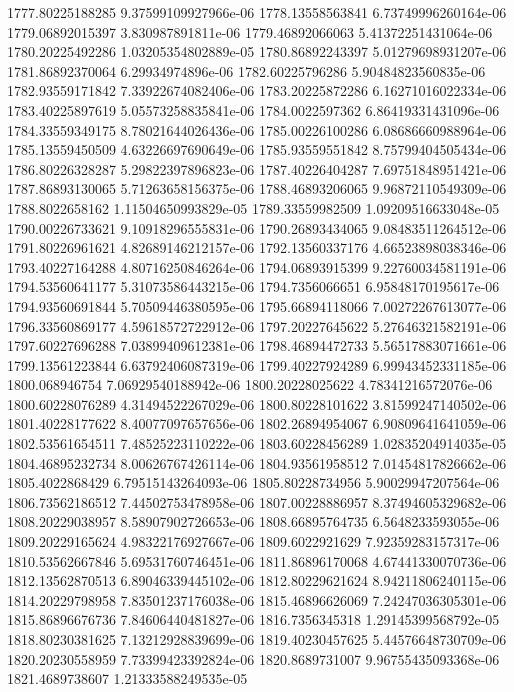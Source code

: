 {1777.80225188285 9.37599109927966e-06
1778.13558563841 6.73749996260164e-06
1779.06892015397 3.830987891811e-06
1779.46892066063 5.41372251431064e-06
1780.20225492286 1.03205354802889e-05
1780.86892243397 5.01279698931207e-06
1781.86892370064 6.29934974896e-06
1782.60225796286 5.90484823560835e-06
1782.93559171842 7.33922674082406e-06
1783.20225872286 6.16271016022334e-06
1783.40225897619 5.05573258835841e-06
1784.0022597362 6.86419331431096e-06
1784.33559349175 8.78021644026436e-06
1785.00226100286 6.08686660988964e-06
1785.13559450509 4.63226697690649e-06
1785.93559551842 8.75799404505434e-06
1786.80226328287 5.29822397896823e-06
1787.40226404287 7.69751848951421e-06
1787.86893130065 5.71263658156375e-06
1788.46893206065 9.96872110549309e-06
1788.8022658162 1.11504650993829e-05
1789.33559982509 1.09209516633048e-05
1790.00226733621 9.10918296555831e-06
1790.26893434065 9.08483511264512e-06
1791.80226961621 4.82689146212157e-06
1792.13560337176 4.66523898038346e-06
1793.40227164288 4.80716250846264e-06
1794.06893915399 9.22760034581191e-06
1794.53560641177 5.31073586443215e-06
1794.7356066651 6.95848170195617e-06
1794.93560691844 5.70509446380595e-06
1795.66894118066 7.00272267613077e-06
1796.33560869177 4.59618572722912e-06
1797.20227645622 5.27646321582191e-06
1797.60227696288 7.03899409612381e-06
1798.46894472733 5.56517883071661e-06
1799.13561223844 6.63792406087319e-06
1799.40227924289 6.99943452331185e-06
1800.068946754 7.06929540188942e-06
1800.20228025622 4.78341216572076e-06
1800.60228076289 4.31494522267029e-06
1800.80228101622 3.81599247140502e-06
1801.40228177622 8.40077097657656e-06
1802.26894954067 6.90809641641059e-06
1802.53561654511 7.48525223110222e-06
1803.60228456289 1.02835204914035e-05
1804.46895232734 8.00626767426114e-06
1804.93561958512 7.01454817826662e-06
1805.4022868429 6.79515143264093e-06
1805.80228734956 5.90029947207564e-06
1806.73562186512 7.44502753478958e-06
1807.00228886957 8.37494605329682e-06
1808.20229038957 8.58907902726653e-06
1808.66895764735 6.5648233593055e-06
1809.20229165624 4.98322176927667e-06
1809.6022921629 7.92359283157317e-06
1810.53562667846 5.69531760746451e-06
1811.86896170068 4.67441330070736e-06
1812.13562870513 6.89046339445102e-06
1812.80229621624 8.94211806240115e-06
1814.20229798958 7.83501237176038e-06
1815.46896626069 7.24247036305301e-06
1815.86896676736 7.84606440481827e-06
1816.7356345318 1.29145399568792e-05
1818.80230381625 7.13212928839699e-06
1819.40230457625 5.44576648730709e-06
1820.20230558959 7.73399423392824e-06
1820.8689731007 9.96755435093368e-06
1821.4689738607 1.21333588249535e-05
}
